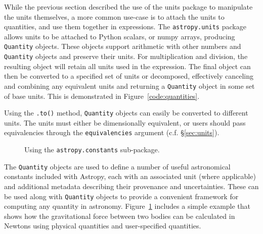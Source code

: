 \documentclass[traditabstract]{aa}
\begin{document}
While the previous section described the use of the units package to manipulate
the units themselves, a more common use-case is to attach the units to
quantities, and use them together in expressions. The \texttt{astropy.units}
package allows units to be attached to Python scalars, or \gls{numpy} arrays,
producing \texttt{Quantity} objects. These objects support arithmetic with
other numbers and \texttt{Quantity} objects and preserve their units. For
multiplication and division, the resulting object will retain all units used in
the expression. The final object can then be converted to a specified set of
units or decomposed, effectively canceling and combining any equivalent units
and returning a \texttt{Quantity} object in some set of base units. This is
demonstrated in Figure~\ref{code:quantities}.

Using the \texttt{.to()} method, \texttt{Quantity} objects can easily be
converted to different units. The units must either be dimensionally
equivalent, or users should pass equivalencies through the
\texttt{equivalencies} argument (c.f. \S\ref{sec:units}).

\begin{figure}
\center
\caption{Using the \texttt{astropy.constants} sub-package.\label{code:constants}}
\vspace{0.1in}
\end{figure}

The \texttt{Quantity} objects are used to define a number of useful
astronomical constants included with Astropy, each with an associated unit
(where applicable) and additional metadata describing their provenance and
uncertainties. These can be used along with \texttt{Quantity} objects to
provide a convenient framework for computing any quantity in astronomy.
Figure~\ref{code:constants} includes a simple example that shows how the
gravitational force between two bodies can be calculated in Newtons using
physical quantities and user-specified quantities.
\end{document}
